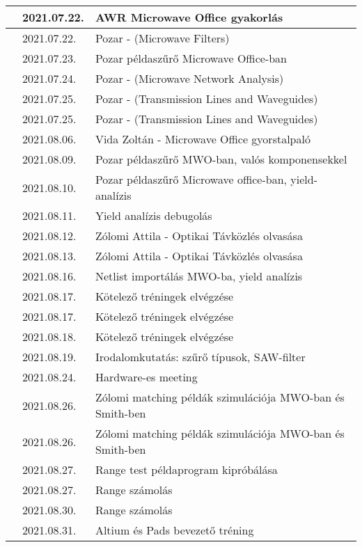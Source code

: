 \documentclass[9pt,a4paper,oneside]{report}
\newcounter{magicrownumbers}
\newcommand\rownum{\stepcounter{magicrownumbers}\arabic{magicrownumbers}}
\begin{document}
\begin{table}[h!]
\begin{tabular}{| c | p{3 cm} | p{10 cm} |}
	\rownum & 2021.07.22. & AWR Microwave Office gyakorlás \\ \hline
	\rownum & 2021.07.22. & Pozar - (Microwave Filters) \\ \hline
	\rownum & 2021.07.23. & Pozar példaszűrő Microwave Office-ban \\ \hline
	\rownum & 2021.07.24. & Pozar - (Microwave Network Analysis) \\ \hline
	\rownum & 2021.07.25. & Pozar - (Transmission Lines and Waveguides) \\ \hline
	\rownum & 2021.07.25. & Pozar - (Transmission Lines and Waveguides) \\ \hline
	\rownum & 2021.08.06. & Vida Zoltán - Microwave Office gyorstalpaló\\ \hline
	\rownum & 2021.08.09. & Pozar példaszűrő MWO-ban, valós komponensekkel \\ \hline
	\rownum & 2021.08.10. & Pozar példaszűrő Microwave office-ban, yield-analízis \\ \hline
	\rownum & 2021.08.11. & Yield analízis debugolás \\ \hline
	\rownum & 2021.08.12. & Zólomi Attila - Optikai Távközlés olvasása \\ \hline
	\rownum & 2021.08.13. & Zólomi Attila - Optikai Távközlés olvasása \\ \hline
	\rownum & 2021.08.16. & Netlist importálás MWO-ba, yield analízis \\ \hline
	\rownum & 2021.08.17. & Kötelező tréningek elvégzése \\ \hline
	\rownum & 2021.08.17. & Kötelező tréningek elvégzése \\ \hline
	\rownum & 2021.08.18. & Kötelező tréningek elvégzése \\ \hline
	\rownum & 2021.08.19. & Irodalomkutatás: szűrő típusok, SAW-filter \\ \hline
	\rownum & 2021.08.24. & Hardware-es meeting \\ \hline
	\rownum & 2021.08.26. & Zólomi matching példák szimulációja MWO-ban és Smith-ben \\ \hline
	\rownum & 2021.08.26. & Zólomi matching példák szimulációja MWO-ban és Smith-ben \\ \hline
	\rownum & 2021.08.27. & Range test példaprogram kipróbálása \\ \hline
	\rownum & 2021.08.27. & Range számolás \\ \hline
	\rownum & 2021.08.30. & Range számolás \\ \hline
	\rownum & 2021.08.31. & Altium és Pads bevezető tréning \\ \hline

\end{tabular}
\end{table}
\end{document}
